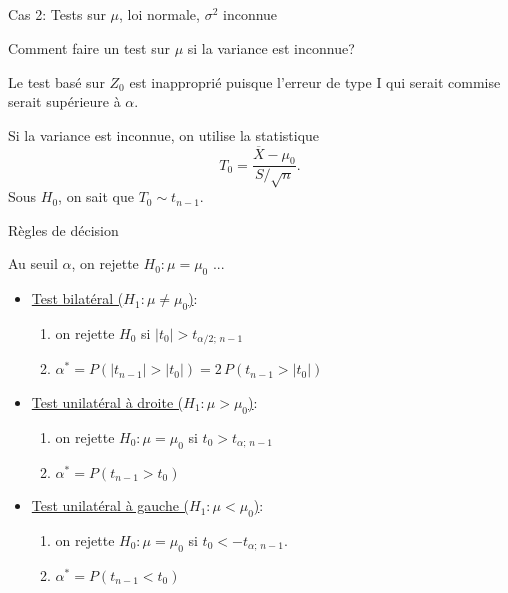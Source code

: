 \documentclass{BeamerTemplate}
\begin{document}
\subsection*{ }


\begin{frame}[t]{Cas 2: Tests sur $\mu$,  loi normale, $\sigma^2$ inconnue}

Comment faire un test sur $\mu$ si la variance est inconnue?

\medskip
Le test basé sur $Z_0$ est inapproprié puisque l'erreur de type I qui serait commise
serait  supérieure à $\alpha$.

\medskip

Si la variance est inconnue, on utilise la statistique
$$
T_0 = \frac{\overline{X}-\mu_0}{S/\sqrt{n}}.
$$
Sous $H_0$, on sait que $T_0\sim t_{n-1}$.

\end{frame}

\begin{frame}[t]{Règles de décision}

{\small
Au seuil $\alpha$, on rejette $H_0:\mu=\mu_0$ ...
\begin{itemize}
\item \underline{Test bilatéral ($H_1 : \mu \ne \mu_0$)}:

    \begin{enumerate}[$\circ$]\itemsep2mm
    \item on rejette $H_0$ si $|t_0| > t_{\alpha/2;\,n-1}$
    \item $\alpha^*=P(|t_{n-1}|>|t_0|)=2\,P(t_{n-1}>|t_0|)$
    \end{enumerate}

\item \underline{Test unilatéral à droite ($H_1 : \mu > \mu_0$)}:

    \begin{enumerate}[$\circ$]\itemsep2mm
    \item on rejette $H_0 : \mu = \mu_0$  si $t_0 > t_{\alpha;\,n-1}$
    \item $\alpha^*=P(t_{n-1}>t_0)$
    \end{enumerate}

\item \underline{Test unilatéral à gauche ($H_1 : \mu < \mu_0$)}:

    \begin{enumerate}[$\circ$]\itemsep2mm
    \item on rejette $H_0 : \mu = \mu_0$ si $t_0 < -t_{\alpha;\,n-1}$.
    \item $\alpha^*=P(t_{n-1}<t_0)$
    \end{enumerate}
\end{itemize}
}
\end{frame}
\end{document}
